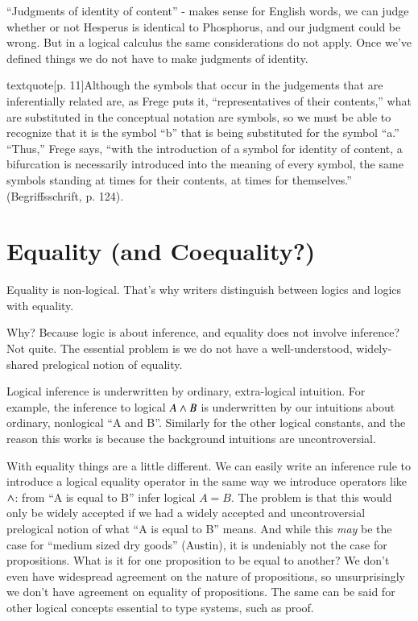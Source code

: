 \documentclass{article}
\begin{document}
``Judgments of identity of content'' - makes sense for English words,
we can judge whether or not Hesperus is identical to Phosphorus, and
our judgment could be wrong. But in a logical calculus the same
considerations do not apply. Once we've defined things we do not have
to make judgments of identity.

textquote[p. 11]{Although the symbols that occur in the judgements
  that are inferentially related are, as Frege puts it,
  “representatives of their contents,” what are substituted in the
  conceptual notation are symbols, so we must be able to recognize
  that it is the symbol “b” that is being substituted for the symbol
  “a.” “Thus,” Frege says, “with the introduction of a symbol for
  identity of content, a bifurcation is necessarily introduced into
  the meaning of every symbol, the same symbols standing at times for
  their contents, at times for themselves.” (Begriffsschrift, p.
  124).}



\section{Equality (and Coequality?)}

Equality is non-logical. That's why writers distinguish between logics
and logics with equality.

Why? Because logic is about inference, and equality does not involve
inference? Not quite. The essential problem is we do not have a well-understood, widely-shared prelogical notion of equality.

Logical inference is underwritten by ordinary, extra-logical
intuition. For example, the inference to logical \(A\land B\) is
underwritten by our intuitions about ordinary, nonlogical ``A and B''.
Similarly for the other logical constants, and the reason this works
is because the background intuitions are uncontroversial.

With equality things are a little different. We can easily write an
inference rule to introduce a logical equality operator in the same
way we introduce operators like \(\land\): from ``A is equal to B''
infer logical \(A=B\). The problem is that this would only be widely
accepted if we had a widely accepted and uncontroversial prelogical
notion of what ``A is equal to B'' means. And while this \textit{may}
be the case for ``medium sized dry goods'' (Austin), it is undeniably
not the case for propositions. What is it for one proposition to be
equal to another? We don't even have widespread agreement on the
nature of propositions, so unsurprisingly we don't have agreement on
equality of propositions. The same can be said for other logical
concepts essential to type systems, such as proof.
\end{document}
